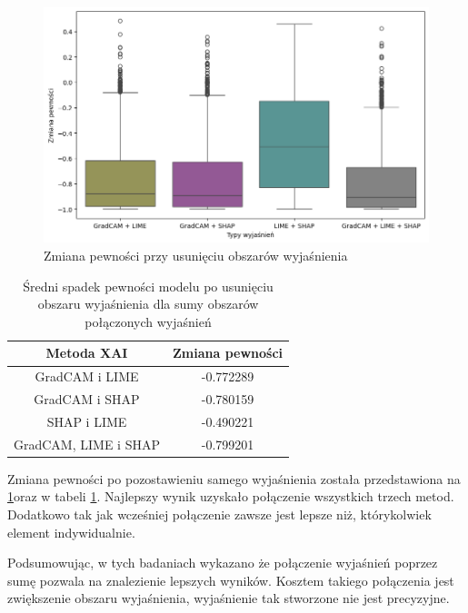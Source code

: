 \begin{figure}[h]
	\centering\includegraphics[width=.9\textwidth]{img/combine_confidence_no_exp_or}
	\caption{Zmiana pewności przy usunięciu obszarów wyjaśnienia}  \label{rys:combineandconfidenceorno}
\end{figure}
\begin{table}[h]
	\centering
	\begin{tabular}{|c|c|}
		\hline
		\textbf{Metoda XAI}  & Zmiana pewności \\
		\hline
		GradCAM i LIME       & -0.772289       \\
		\hline
		GradCAM i SHAP       & -0.780159       \\
		\hline
		SHAP i LIME          & -0.490221       \\
		\hline
		GradCAM, LIME i SHAP & -0.799201       \\
		\hline
	\end{tabular}
	\caption{Średni spadek pewności modelu po usunięciu obszaru wyjaśnienia dla sumy obszarów połączonych wyjaśnień}
	\label{tab:combineandconfidenceorno}
\end{table}
Zmiana pewności po pozostawieniu samego wyjaśnienia została przedstawiona na \ref{rys:combineandconfidenceorno}oraz w tabeli \ref{tab:combineandconfidenceorno}.
Najlepszy wynik uzyskało połączenie wszystkich trzech metod.
Dodatkowo tak jak wcześniej połączenie zawsze jest lepsze niż, którykolwiek element indywidualnie.

\vspace{1cm}
Podsumowując, w tych badaniach wykazano że połączenie wyjaśnień poprzez sumę pozwala na znalezienie lepszych wyników.
Kosztem takiego połączenia jest zwiększenie obszaru wyjaśnienia, wyjaśnienie tak stworzone nie jest precyzyjne.
